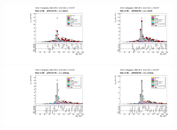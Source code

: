 \begin{figure}[htb]
  \begin{center}
    \includegraphics[width=0.40\textwidth]{../figs/figs_v11/ELECTRON_WGamma/PrepareYields/c_TotalDATAvsMC_Barrel__Mpholep1PRELIMINARY_FOR_E_TO_GAMMA_WITH_PSV_CUT_pt55to65_.pdf}\includegraphics[width=0.40\textwidth]{../figs/figs_v11/ELECTRON_WGamma/PrepareYields/c_TotalDATAvsMC_Barrel__Mpholep1PRELIMINARY_FOR_E_TO_GAMMA_WITH_PSV_CUT_pt55to65__etogScale.pdf}\\    
    \includegraphics[width=0.40\textwidth]{../figs/figs_v11/ELECTRON_WGamma/PrepareYields/c_TotalDATAvsMC_Endcap__Mpholep1PRELIMINARY_FOR_E_TO_GAMMA_WITH_PSV_CUT_pt55to65_.pdf}\includegraphics[width=0.40\textwidth]{../figs/figs_v11/ELECTRON_WGamma/PrepareYields/c_TotalDATAvsMC_Endcap__Mpholep1PRELIMINARY_FOR_E_TO_GAMMA_WITH_PSV_CUT_pt55to65__etogScale.pdf}\\

\end{center}
\end{figure}
